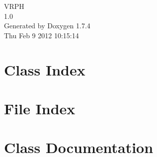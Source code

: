 \documentclass[letterpaper]{book}
\begin{document}
\hypersetup{pageanchor=false}
\begin{titlepage}
\vspace*{7cm}
\begin{center}
{\Large VRPH \\[1ex]\large 1.0 }\\
\vspace*{1cm}
{\large Generated by Doxygen 1.7.4}\\
\vspace*{0.5cm}
{\small Thu Feb 9 2012 10:15:14}\\
\end{center}
\end{titlepage}
\clearemptydoublepage
{}
\tableofcontents
\clearemptydoublepage
{}
\hypersetup{pageanchor=true}
\chapter{Class Index}

\chapter{File Index}

\chapter{Class Documentation}


































\end{document}
